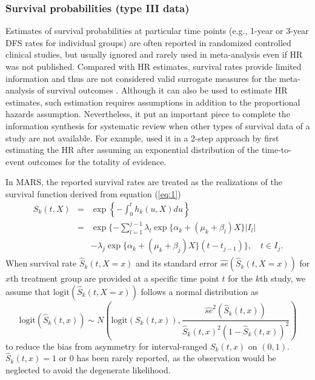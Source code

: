 \documentclass[12pt]{article}
\theoremstyle{mystyle}
\begin{document}
\subsubsection{Survival probabilities (type III data)}
\label{subsec:4:3} 

Estimates of survival probabilities at particular time points (e.g., 1-year or 3-year DFS rates for individual groups) are often reported in randomized controlled clinical studies,  but usually ignored and rarely used in meta-analysis even if HR was not published.
Compared with HR estimates, survival rates provide limited information and thus are not considered valid surrogate measures for the meta-analysis of survival outcomes \citep{Michiels2005}. Although it can also be used to estimate HR estimates, such estimation requires assumptions in addition to the proportional hazards assumption. Nevertheless, it put an important piece to complete the information synthesis for systematic review when other types of survival data of a study are not available. For example, \cite{Berry2017} used it in a 2-step approach by first estimating the HR after assuming an exponential distribution of the time-to-event outcomes for the totality of evidence. 
	
In MARS, the reported survival rates are treated as the realizations of the survival function derived from equation (\ref{eq:1})
\begin{eqnarray}
\label{eq:3}
S_{k}(t,X)&=& \exp \left\{ -\int_{0}^{t}h_k(u,X)du\right\} \nonumber\\
&=&\exp \{-\sum_{l=1}^{j-1}\lambda_l\exp\{\alpha_k+(\mu_k+\beta_l) X\}|I_l| \nonumber\\
&& -\lambda_j\exp\{\alpha_k+(\mu_k+\beta_j) X\}(t-t_{j-1}) \}, \quad t\in I_j.
\end{eqnarray} 
When survival rate $\hat{S}_k(t,X=x)$ and its standard error $\hat{se}(\hat{S}_k(t,X=x))$ for $x$th treatment group are provided at a specific time point $t$ for the $k$th study, we assume that $\text{logit}(\hat{S}_k(t,X=x))$ follows a normal distribution as
\begin{equation*}
\text{logit}(\hat{S}_k(t,x))\sim N\left(\text{logit}(S_k(t,x)),\frac{\hat{se}^2(\hat{S}_k(t,x))}{\hat{S}_k(t,x)^2(1-\hat{S}_k(t,x))^2}\right)
\end{equation*}
to reduce the bias from asymmetry for interval-ranged $S_k(t,x)$ on $(0,1)$. $\hat{S}_k(t,x)=1$ or $0$ has been rarely reported, as the observation would be neglected to avoid the degenerate likelihood.
\end{document}
